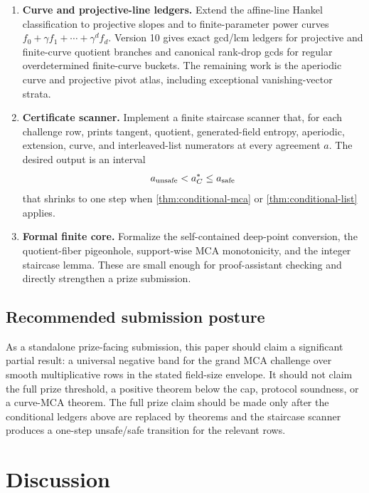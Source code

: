\documentclass[11pt]{article}
\theoremstyle{definition}
\theoremstyle{remark}
\begin{document}
\begin{enumerate}[label=\textbf{T\arabic*.},leftmargin=2.5em]
\item \textbf{Curve and projective-line ledgers.}  Extend the affine-line Hankel
classification to projective slopes and to finite-parameter power curves
$f_0+\gamma f_1+\cdots+\gamma^d f_d$.  Version 10 gives exact gcd/lcm ledgers
for projective and finite-curve quotient branches and canonical rank-drop gcds
for regular overdetermined finite-curve buckets.  The remaining work is the
aperiodic curve and projective pivot atlas, including exceptional
vanishing-vector strata.

\item \textbf{Certificate scanner.}  Implement a finite staircase scanner that,
for each challenge row, prints tangent, quotient, generated-field entropy,
aperiodic, extension, curve, and interleaved-list numerators at every agreement
$a$.  The desired output is an interval
\[
        a_{\rm unsafe}<a_C^*\le a_{\rm safe}
\]
that shrinks to one step when \cref{thm:conditional-mca} or
\cref{thm:conditional-list} applies.

\item \textbf{Formal finite core.}  Formalize the self-contained deep-point
conversion, the quotient-fiber pigeonhole, support-wise MCA monotonicity, and
the integer staircase lemma.  These are small enough for proof-assistant
checking and directly strengthen a prize submission.
\end{enumerate}

\subsection{Recommended submission posture}

As a standalone prize-facing submission, this paper should claim a significant
partial result: a universal negative band for the grand MCA challenge over
smooth multiplicative rows in the stated field-size envelope.  It should not
claim the full prize threshold, a positive theorem below the cap, protocol
soundness, or a curve-MCA theorem.  The full prize claim should be made only
after the conditional ledgers above are replaced by theorems and the staircase
scanner produces a one-step unsafe/safe transition for the relevant rows.


\section{Discussion}\label{sec:discussion}
\end{document}
